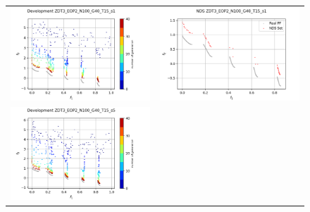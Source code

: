 \begin{figure}[H]
    \centering
    \begin{tabular}{c c}
    \includegraphics[scale=0.5]{figures/ZDT3_EOP2_N100_G40_T15/s1_dev.png} &
    \includegraphics[scale=0.5]{figures/ZDT3_EOP2_N100_G40_T15/s1_nds.png}\\
    \includegraphics[scale=0.5]{figures/ZDT3_EOP2_N100_G40_T15/s5_dev.png} &

\end{tabular}
\end{figure}
